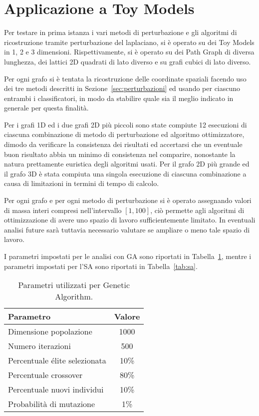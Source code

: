 \documentclass[10pt,a4paper]{article}
\begin{document}
\section{Applicazione a Toy Models}\label{sec:applicazione}

Per testare in prima istanza i vari metodi di perturbazione e gli algoritmi di ricostruzione tramite perturbazione del laplaciano, si è operato su dei Toy Models in 1, 2 e 3 dimensioni.
Rispettivamente, si è operato su dei Path Graph di diversa lunghezza, dei lattici 2D quadrati di lato diverso e su grafi cubici di lato diverso.

Per ogni grafo si è tentata la ricostruzione delle coordinate spaziali facendo uso dei tre metodi descritti in Sezione~\ref{sec:perturbazioni} ed usando per ciascuno entrambi i classificatori, in modo da stabilire quale sia il meglio indicato in generale per questa finalità.

Per i grafi 1D ed i due grafi 2D più piccoli sono state compiute 12 esecuzioni di ciascuna combinazione di metodo di perturbazione ed algoritmo ottimizzatore, dimodo da verificare la consistenza dei risultati ed accertarsi che un eventuale buon risultato abbia un minimo di consistenza nel comparire, nonostante la natura prettamente euristica degli algoritmi usati. Per il grafo 2D più grande ed il grafo 3D è stata compiuta una singola esecuzione di ciascuna combinazione a causa di limitazioni in termini di tempo di calcolo.

Per ogni grafo e per ogni metodo di perturbazione si è operato assegnando valori di massa interi compresi nell'intervallo \([1, 100]\), ciò permette agli algoritmi di ottimizzazione di avere uno spazio di lavoro sufficientemente limitato. In eventuali analisi future sarà tuttavia necessario valutare se ampliare o meno tale spazio di lavoro.

I parametri impostati per le analisi con GA sono riportati in Tabella~\ref{tab:ga}, mentre i parametri impostati per l'SA sono riportati in Tabella~\ref{tab:sa}.

\begin{table}[!htp]
    \centering
    \begin{tabular}{lc}
        \toprule
        Parametro & Valore \\
        \midrule
        Dimensione popolazione & 1000 \\
        Numero iterazioni & 500 \\
        Percentuale élite selezionata & 10\% \\
        Percentuale crossover & 80\% \\
        Percentuale nuovi individui & 10\% \\
        Probabilità di mutazione & 1\% \\ 
        \bottomrule
    \end{tabular}
    \caption{Parametri utilizzati per Genetic Algorithm.}\label{tab:ga}
\end{table}
\end{document}
